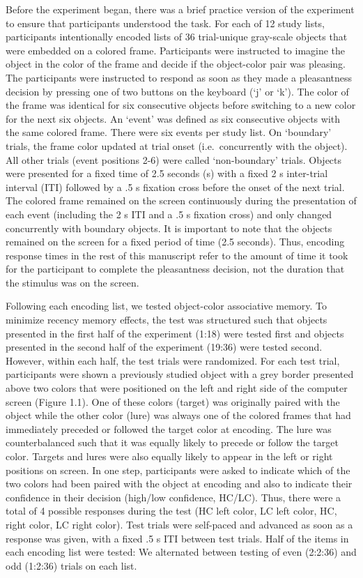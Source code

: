 Before the experiment began, there was a brief practice version of the
experiment to ensure that participants understood the task. For each of
12 study lists, participants intentionally encoded lists of 36
trial-unique gray-scale objects that were embedded on a colored frame.
Participants were instructed to imagine the object in the color of the
frame and decide if the object-color pair was pleasing. The participants
were instructed to respond as soon as they made a pleasantness decision
by pressing one of two buttons on the keyboard (`j' or `k'). The color
of the frame was identical for six consecutive objects before switching
to a new color for the next six objects. An `event' was defined as six
consecutive objects with the same colored frame. There were six events
per study list. On `boundary' trials, the frame color updated at trial
onset (i.e.~concurrently with the object). All other trials (event
positions 2-6) were called `non-boundary' trials. Objects were presented
for a fixed time of 2.5 seconds (s) with a fixed 2 s inter-trial
interval (ITI) followed by a .5 s fixation cross before the onset of the
next trial. The colored frame remained on the screen continuously during
the presentation of each event (including the 2 s ITI and a .5 s
fixation cross) and only changed concurrently with boundary objects. It
is important to note that the objects remained on the screen for a fixed
period of time (2.5 seconds). Thus, encoding response times in the rest
of this manuscript refer to the amount of time it took for the
participant to complete the pleasantness decision, not the duration that
the stimulus was on the screen.

Following each encoding list, we tested object-color associative memory.
To minimize recency memory effects, the test was structured such that
objects presented in the first half of the experiment (1:18) were tested
first and objects presented in the second half of the experiment (19:36)
were tested second. However, within each half, the test trials were
randomized. For each test trial, participants were shown a previously
studied object with a grey border presented above two colors that were
positioned on the left and right side of the computer screen (Figure
1.1). One of these colors (target) was originally paired with the object
while the other color (lure) was always one of the colored frames that
had immediately preceded or followed the target color at encoding. The
lure was counterbalanced such that it was equally likely to precede or
follow the target color. Targets and lures were also equally likely to
appear in the left or right positions on screen. In one step,
participants were asked to indicate which of the two colors had been
paired with the object at encoding and also to indicate their confidence
in their decision (high/low confidence, HC/LC). Thus, there were a total
of 4 possible responses during the test (HC left color, LC left color,
HC, right color, LC right color). Test trials were self-paced and
advanced as soon as a response was given, with a fixed .5 s ITI between
test trials. Half of the items in each encoding list were tested: We
alternated between testing of even (2:2:36) and odd (1:2:36) trials on
each list.

